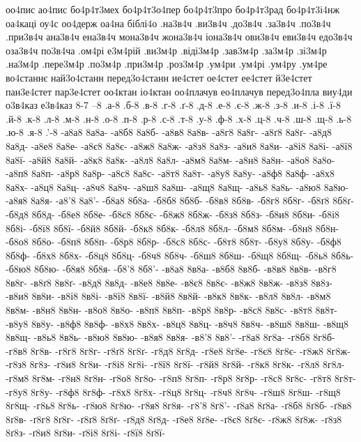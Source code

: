 {оо4пис
ао4пис
бо4р4т3мех
бо4р4т3о4пер
бо4р4т3про
бо4р4т3рад
бо4р4т3і4нж
оа4каці
оу4с
оо4держ
оа4на
біблі4о
.на3в4ч
.ви3в4ч
.до3в4ч
.за3в4ч
.по3в4ч
.при3в4ч
ана3в4ч
ена3в4ч
мона3в4ч
жона3в4ч
іона3в4ч
ови3в4ч
еви3в4ч
едо3в4ч
оза3в4ч
по3в4ча
.ом4рі
е3м4рій
.ви3м4р
.віді3м4р
.зав3м4р
.за3м4р
.зі3м4р
.на3м4р
.пере3м4р
.по3м4р
.при3м4р
.роз3м4р
.ум4ри
.ум4рі
.ум4ру
.ум4ре
во4станнє
най3о4станн
перед3о4станн
ие4стет  
ое4стет  
ее4стет  
й3е4стет  
пан3е4стет
пар3е4стет
оо4ктан
іо4ктан
оо4плачув
ео4плачув
перед3о4пла
виу4ди
о3в4каз
е3в4каз
8-7
--8
.а-8
.б-8
.в-8
.г-8
.ґ-8
.д-8
.е-8
.є-8
.ж-8
.з-8
.и-8
.і-8
.ї-8
.й-8
.к-8
.л-8
.м-8
.н-8
.о-8
.п-8
.р-8
.с-8
.т-8
.у-8
.ф-8
.х-8
.ц-8
.ч-8
.ш-8
.щ-8
.ь-8
.ю-8
.я-8
.'-8
-а8а8
8а8а-
-а8б8
8а8б-
-а8в8
8а8в-
-а8г8
8а8г-
-а8ґ8
8а8ґ-
-а8д8
8а8д-
-а8е8
8а8е-
-а8є8
8а8є-
-а8ж8
8а8ж-
-а8з8
8а8з-
-а8и8
8а8и-
-а8і8
8а8і-
-а8ї8
8а8ї-
-а8й8
8а8й-
-а8к8
8а8к-
-а8л8
8а8л-
-а8м8
8а8м-
-а8н8
8а8н-
-а8о8
8а8о-
-а8п8
8а8п-
-а8р8
8а8р-
-а8с8
8а8с-
-а8т8
8а8т-
-а8у8
8а8у-
-а8ф8
8а8ф-
-а8х8
8а8х-
-а8ц8
8а8ц-
-а8ч8
8а8ч-
-а8ш8
8а8ш-
-а8щ8
8а8щ-
-а8ь8
8а8ь-
-а8ю8
8а8ю-
-а8я8
8а8я-
-а8'8
8а8'-
-б8а8
8б8а-
-б8б8
8б8б-
-б8в8
8б8в-
-б8г8
8б8г-
-б8ґ8
8б8ґ-
-б8д8
8б8д-
-б8е8
8б8е-
-б8є8
8б8є-
-б8ж8
8б8ж-
-б8з8
8б8з-
-б8и8
8б8и-
-б8і8
8б8і-
-б8ї8
8б8ї-
-б8й8
8б8й-
-б8к8
8б8к-
-б8л8
8б8л-
-б8м8
8б8м-
-б8н8
8б8н-
-б8о8
8б8о-
-б8п8
8б8п-
-б8р8
8б8р-
-б8с8
8б8с-
-б8т8
8б8т-
-б8у8
8б8у-
-б8ф8
8б8ф-
-б8х8
8б8х-
-б8ц8
8б8ц-
-б8ч8
8б8ч-
-б8ш8
8б8ш-
-б8щ8
8б8щ-
-б8ь8
8б8ь-
-б8ю8
8б8ю-
-б8я8
8б8я-
-б8'8
8б8'-
-в8а8
8в8а-
-в8б8
8в8б-
-в8в8
8в8в-
-в8г8
8в8г-
-в8ґ8
8в8ґ-
-в8д8
8в8д-
-в8е8
8в8е-
-в8є8
8в8є-
-в8ж8
8в8ж-
-в8з8
8в8з-
-в8и8
8в8и-
-в8і8
8в8і-
-в8ї8
8в8ї-
-в8й8
8в8й-
-в8к8
8в8к-
-в8л8
8в8л-
-в8м8
8в8м-
-в8н8
8в8н-
-в8о8
8в8о-
-в8п8
8в8п-
-в8р8
8в8р-
-в8с8
8в8с-
-в8т8
8в8т-
-в8у8
8в8у-
-в8ф8
8в8ф-
-в8х8
8в8х-
-в8ц8
8в8ц-
-в8ч8
8в8ч-
-в8ш8
8в8ш-
-в8щ8
8в8щ-
-в8ь8
8в8ь-
-в8ю8
8в8ю-
-в8я8
8в8я-
-в8'8
8в8'-
-г8а8
8г8а-
-г8б8
8г8б-
-г8в8
8г8в-
-г8г8
8г8г-
-г8ґ8
8г8ґ-
-г8д8
8г8д-
-г8е8
8г8е-
-г8є8
8г8є-
-г8ж8
8г8ж-
-г8з8
8г8з-
-г8и8
8г8и-
-г8і8
8г8і-
-г8ї8
8г8ї-
-г8й8
8г8й-
-г8к8
8г8к-
-г8л8
8г8л-
-г8м8
8г8м-
-г8н8
8г8н-
-г8о8
8г8о-
-г8п8
8г8п-
-г8р8
8г8р-
-г8с8
8г8с-
-г8т8
8г8т-
-г8у8
8г8у-
-г8ф8
8г8ф-
-г8х8
8г8х-
-г8ц8
8г8ц-
-г8ч8
8г8ч-
-г8ш8
8г8ш-
-г8щ8
8г8щ-
-г8ь8
8г8ь-
-г8ю8
8г8ю-
-г8я8
8г8я-
-г8'8
8г8'-
-ґ8а8
8ґ8а-
-ґ8б8
8ґ8б-
-ґ8в8
8ґ8в-
-ґ8г8
8ґ8г-
-ґ8ґ8
8ґ8ґ-
-ґ8д8
8ґ8д-
-ґ8е8
8ґ8е-
-ґ8є8
8ґ8є-
-ґ8ж8
8ґ8ж-
-ґ8з8
8ґ8з-
-ґ8и8
8ґ8и-
-ґ8і8
8ґ8і-
-ґ8ї8
8ґ8ї-
}
